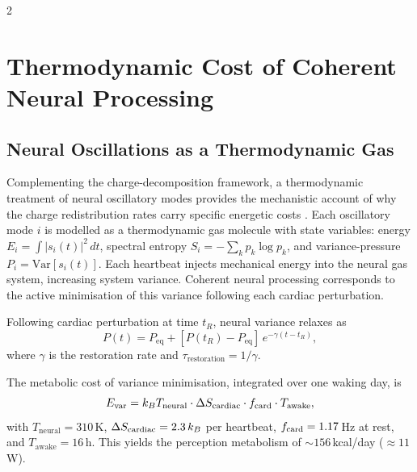 \begin{multicols}{2}

\section{Thermodynamic Cost of Coherent Neural Processing}
\label{sec:ch08-thermo}

\subsection{Neural Oscillations as a Thermodynamic Gas}

Complementing the charge-decomposition framework, a thermodynamic treatment of neural oscillatory modes provides the mechanistic account of why the charge redistribution rates carry specific energetic costs \citep{sachikonye2024_metabolic}. Each oscillatory mode $i$ is modelled as a thermodynamic gas molecule with state variables: energy $E_i = \int |s_i(t)|^2\,dt$, spectral entropy $S_i = -\sum_k p_k\log p_k$, and variance-pressure $P_i = \mathrm{Var}[s_i(t)]$. Each heartbeat injects mechanical energy into the neural gas system, increasing system variance. Coherent neural processing corresponds to the active minimisation of this variance following each cardiac perturbation.

\begin{theorem}
\label{thm:ch08-variance}
Following cardiac perturbation at time $t_R$, neural variance relaxes as
\begin{equation}
P(t) = P_{\mathrm{eq}} + [P(t_R) - P_{\mathrm{eq}}]\,e^{-\gamma(t-t_R)},
\label{eq:ch08-variance}
\end{equation}
where $\gamma$ is the restoration rate and $\tau_{\mathrm{restoration}} = 1/\gamma$.
\end{theorem}

The metabolic cost of variance minimisation, integrated over one waking day, is
\begin{equation}
E_{\mathrm{var}} = k_B T_{\mathrm{neural}} \cdot \Delta S_{\mathrm{cardiac}} \cdot f_{\mathrm{card}} \cdot T_{\mathrm{awake}},
\label{eq:ch08-Evar}
\end{equation}
with $T_{\mathrm{neural}} = 310$\,K, $\Delta S_{\mathrm{cardiac}} = 2.3\,k_B$ per heartbeat, $f_{\mathrm{card}} = 1.17$\,Hz at rest, and $T_{\mathrm{awake}} = 16$\,h. This yields the perception metabolism of $\sim 156$\,kcal/day ($\approx 11$\,W).


\end{multicols}
